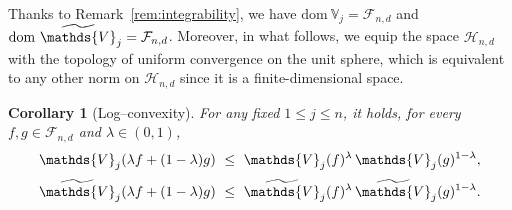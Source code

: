 \documentclass[11pt]{article}
\newtheorem{corollary}[theorem]{Corollary}
\theoremstyle{definition}
\numberwithin{equation}{section}
\newcommand{\R}{\mathbb{R}}
\newcommand{\cH}{\mathcal{H}}        %
\newcommand{\cF}{\mathcal{F}}
\newcommand{\cP}{\mathcal{P}}        %
\newcommand{\opV}{\mathds{V}}       %
\begin{document}
\medskip

Thanks to Remark~\ref{rem:integrability}, we have $\mathrm{dom}~\opV_j = \cF_{n, d}$ and $\mathrm{dom}~\widetilde\opV_j = \cF_{n, d}$.
Moreover, in what follows, we equip the space $\cH_{n, d}$ with the topology of uniform convergence on the unit sphere, which is equivalent to any other norm on $\cH_{n, d}$ since it is a finite-dimensional space.


%

\begin{corollary}[Log–convexity]\label{cor:logconvex}
For any fixed $1 \leq j \leq n$, it holds, for every $ f, g \in \cF_{n, d}$  and  $\lambda \in (0, 1)$,
\[
\begin{aligned}
\opV_j(\lambda f+(1-\lambda)g)
&\ \le\ \opV_j(f)^\lambda\,\opV_j(g)^{1-\lambda},\\[1mm]
\widetilde \opV_j(\lambda f+(1-\lambda)g)
&\ \le\ \widetilde \opV_j(f)^\lambda\,\widetilde \opV_j(g)^{1-\lambda}.
\end{aligned}
\]
\end{corollary}
\end{document}

